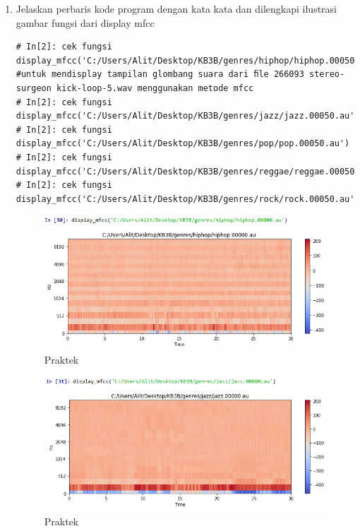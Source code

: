 \begin{enumerate}
\item Jelaskan perbaris kode program dengan kata kata dan dilengkapi ilustrasi gambar fungsi dari display mfcc
\begin{verbatim}
# In[2]: cek fungsi
display_mfcc('C:/Users/Alit/Desktop/KB3B/genres/hiphop/hiphop.00050.au') 
#untuk mendisplay tampilan glombang suara dari ﬁle 266093 stereo-surgeon kick-loop-5.wav menggunakan metode mfcc
# In[2]: cek fungsi
display_mfcc('C:/Users/Alit/Desktop/KB3B/genres/jazz/jazz.00050.au')
# In[2]: cek fungsi
display_mfcc('C:/Users/Alit/Desktop/KB3B/genres/pop/pop.00050.au')
# In[2]: cek fungsi
display_mfcc('C:/Users/Alit/Desktop/KB3B/genres/reggae/reggae.00050.au')
# In[2]: cek fungsi
display_mfcc('C:/Users/Alit/Desktop/KB3B/genres/rock/rock.00050.au')
\end{verbatim}

    	   	\begin{figure}[H]
				\centering
				\includegraphics[scale=0.5]{figures/1174057/chapter6/p2.PNG}
				\caption{Praktek}
				\label{Praktek}
			\end{figure}
	
    	   	\begin{figure}[H]
				\centering
				\includegraphics[scale=0.5]{figures/1174057/chapter6/p2_1.PNG}
				\caption{Praktek}
				\label{Praktek}
			\end{figure}


\end{enumerate}
